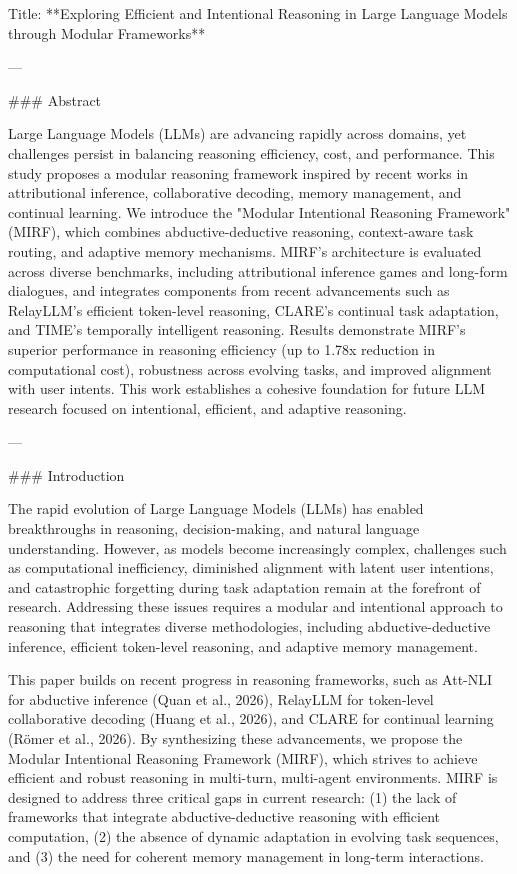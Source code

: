 Title: **Exploring Efficient and Intentional Reasoning in Large Language Models through Modular Frameworks**

---

### Abstract

Large Language Models (LLMs) are advancing rapidly across domains, yet challenges persist in balancing reasoning efficiency, cost, and performance. This study proposes a modular reasoning framework inspired by recent works in attributional inference, collaborative decoding, memory management, and continual learning. We introduce the "Modular Intentional Reasoning Framework" (MIRF), which combines abductive-deductive reasoning, context-aware task routing, and adaptive memory mechanisms. MIRF's architecture is evaluated across diverse benchmarks, including attributional inference games and long-form dialogues, and integrates components from recent advancements such as RelayLLM's efficient token-level reasoning, CLARE's continual task adaptation, and TIME's temporally intelligent reasoning. Results demonstrate MIRF's superior performance in reasoning efficiency (up to 1.78x reduction in computational cost), robustness across evolving tasks, and improved alignment with user intents. This work establishes a cohesive foundation for future LLM research focused on intentional, efficient, and adaptive reasoning.

---

### Introduction

The rapid evolution of Large Language Models (LLMs) has enabled breakthroughs in reasoning, decision-making, and natural language understanding. However, as models become increasingly complex, challenges such as computational inefficiency, diminished alignment with latent user intentions, and catastrophic forgetting during task adaptation remain at the forefront of research. Addressing these issues requires a modular and intentional approach to reasoning that integrates diverse methodologies, including abductive-deductive inference, efficient token-level reasoning, and adaptive memory management.

This paper builds on recent progress in reasoning frameworks, such as Att-NLI for abductive inference (Quan et al., 2026), RelayLLM for token-level collaborative decoding (Huang et al., 2026), and CLARE for continual learning (Römer et al., 2026). By synthesizing these advancements, we propose the Modular Intentional Reasoning Framework (MIRF), which strives to achieve efficient and robust reasoning in multi-turn, multi-agent environments. MIRF is designed to address three critical gaps in current research: (1) the lack of frameworks that integrate abductive-deductive reasoning with efficient computation, (2) the absence of dynamic adaptation in evolving task sequences, and (3) the need for coherent memory management in long-term interactions.

